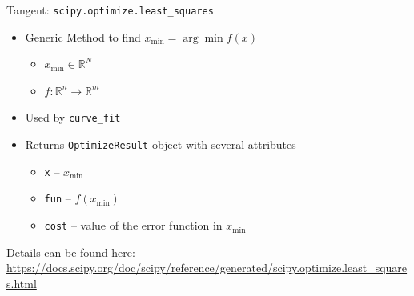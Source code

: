 \begin{frame}{Tangent: \texttt{scipy.optimize.least\_squares}}
%
\begin{itemize}
\item Generic Method to find $x_{\text{min}} = \arg\min{f(x)}$
	\begin{itemize}
	\item $x_{\text{min}} \in \mathbb{R}^{N}$
	\item $f: \mathbb{R}^{n} \to \mathbb{R}^{m}$
	\end{itemize}
\item Used by \texttt{curve\_fit}
\item Returns \texttt{OptimizeResult} object with several attributes
	\begin{itemize}
	\item \texttt{x} -- $x_{\text{min}}$
	\item \texttt{fun} -- $f(x_{\text{min}})$
	\item \texttt{cost} -- value of the error function in $x_{\text{min}}$
	\end{itemize}
\end{itemize}
%
\begin{hintbox}
\small
Details can be found here:
\url{https://docs.scipy.org/doc/scipy/reference/generated/scipy.optimize.least_squares.html}
\end{hintbox}
%
\end{frame}


